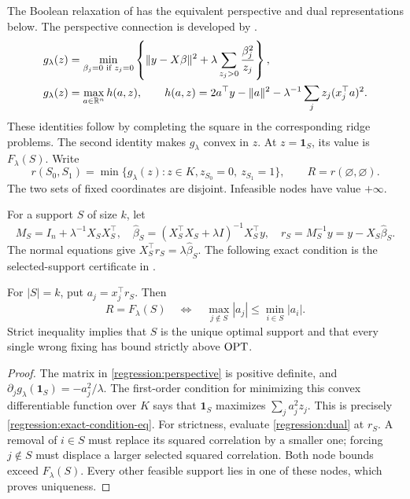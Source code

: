 The Boolean relaxation of
\citet{pilanciWainwrightElGhaoui2015BooleanRelaxation} has the equivalent
perspective and dual representations below. The perspective connection
is developed by \citet{xieDeng2018BooleanRelaxation}.
\begin{align}
 g_\lambda(z)&=\min_{\beta_j=0\text{ if }z_j=0}
  \left\{\|y-X\beta\|^2+
       \lambda\sum_{z_j>0}\frac{\beta_j^2}{z_j}\right\},
       \label{regression:primal}\\
 g_\lambda(z)&=\max_{a\in\mathbb{R}^n}h(a,z),\qquad
 h(a,z)=2a^\top y-\|a\|^2-\lambda^{-1}
       \sum_jz_j(x_j^\top a)^2.\label{regression:dual}
\end{align}
These identities follow by completing the square in the corresponding
ridge problems. The second identity makes $g_\lambda$ convex in $z$.
At $z=\mathbf1_S$, its value is $F_\lambda(S)$. Write
\begin{equation}\label{regression:node}
 r(S_0,S_1)=\min\{g_\lambda(z):z\in K,
                         z_{S_0}=0,\ z_{S_1}=1\},\qquad R=r(\varnothing,\varnothing).
\end{equation}
The two sets of fixed coordinates are disjoint. Infeasible nodes have
value $+\infty$.

For a support $S$ of size $k$, let
\begin{equation}\label{regression:residual}
 M_S=I_n+\lambda^{-1}X_SX_S^\top,\quad
 \widehat\beta_S=(X_S^\top X_S+\lambda I)^{-1}X_S^\top y,\quad
 r_S=M_S^{-1}y=y-X_S\widehat\beta_S.
\end{equation}
The normal equations give $X_S^\top r_S=\lambda\widehat\beta_S$.
The following exact condition is the selected-support certificate in
\citet[Corollary~2]{pilanciWainwrightElGhaoui2015BooleanRelaxation}.

\begin{proposition}
\label{regression:exact-condition}
For $|S|=k$, put $a_j=x_j^\top r_S$. Then
\begin{equation}\label{regression:exact-condition-eq}
 R=F_\lambda(S)\quad\Longleftrightarrow\quad
 \max_{j\notin S}|a_j|\leq\min_{i\in S}|a_i|.
\end{equation}
Strict inequality implies that $S$ is the unique optimal support and that
every single wrong fixing has bound strictly above $\operatorname{OPT}$.
\end{proposition}
\begin{proof}
The matrix in \eqref{regression:perspective} is positive definite, and
$\partial_jg_\lambda(\mathbf1_S)=-a_j^2/\lambda$.
The first-order condition for minimizing this convex differentiable
function over $K$ says that $\mathbf1_S$ maximizes
$\sum_j a_j^2z_j$. This is precisely \eqref{regression:exact-condition-eq}.
For strictness, evaluate \eqref{regression:dual} at $r_S$. A removal of
$i\in S$ must replace its squared correlation by a smaller one; forcing
$j\notin S$ must displace a larger selected squared correlation. Both
node bounds exceed $F_\lambda(S)$. Every other feasible support lies in
one of these nodes, which proves uniqueness.
\end{proof}

